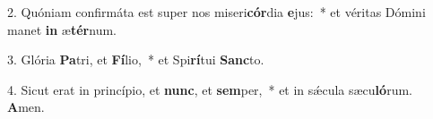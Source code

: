 2. Quóniam confirmáta est super nos miseri\textbf{cór}dia \textbf{e}jus:~*  et véritas Dómini manet \textbf{in} æ\textbf{tér}num.\

3. Glória \textbf{Pa}tri, et \textbf{Fí}lio,~*  et Spi\textbf{rí}tui \textbf{Sanc}to.\

4. Sicut erat in princípio, et \textbf{nunc}, et \textbf{sem}per,~*  et in sǽcula sæcu\textbf{ló}rum. \textbf{A}men.\

